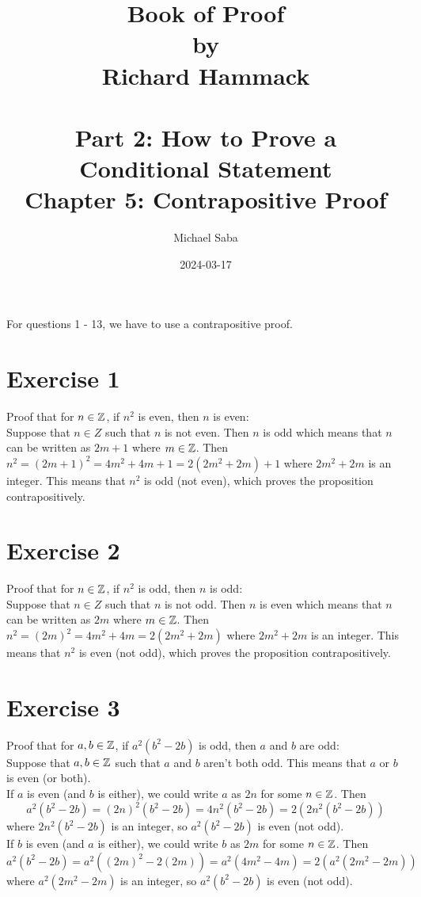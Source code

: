 \documentclass[12pt]{article}
\title{%
    \Huge Book of Proof \\
    \large by \\
    \Large Richard Hammack \\~\\
    \huge Part 2: How to Prove a Conditional Statement \\
    \LARGE Chapter 5: Contrapositive Proof
}
\date{2024-03-17}
\author{Michael Saba}
\begin{document}
    \maketitle
    \newpage
    \setlength{\parindent}{0pt}

    For questions 1 - 13, we have to use a contrapositive proof. \\

    \section*{Exercise 1}
    Proof that for $n \in \mathbb{Z}$,
    if $n^2$ is even,
    then $n$ is even: \\
    Suppose that $n \in Z$ 
    such that $n$ is not even.
    Then $n$ is odd which means
    that $n$ can be written as $2m + 1$ where $m \in \mathbb{Z}$.
    Then $n^2 = (2m+1)^2 = 4m^2 + 4m + 1 = 2(2m^2 + 2m) + 1$
    where $2m^2 + 2m$ is an integer.
    This means that $n^2$ is odd (not even),
    which proves the proposition contrapositively.

    \section*{Exercise 2}
    Proof that for $n \in \mathbb{Z}$,
    if $n^2$ is odd,
    then $n$ is odd: \\
    Suppose that $n \in Z$ 
    such that $n$ is not odd.
    Then $n$ is even which means
    that $n$ can be written as $2m$ where $m \in \mathbb{Z}$.
    Then $n^2 = (2m)^2 = 4m^2 + 4m = 2(2m^2 + 2m)$
    where $2m^2 + 2m$ is an integer.
    This means that $n^2$ is even (not odd),
    which proves the proposition contrapositively.

    \section*{Exercise 3}
    Proof that for $a, b \in \mathbb{Z}$,
    if $a^2(b^2 - 2b)$ is odd,
    then $a$ and $b$ are odd: \\
    Suppose that $a, b \in \mathbb{Z}$
    such that $a$ and $b$ aren't both odd. 
    This means that $a$ or $b$ is even (or both). \\
    If $a$ is even (and $b$ is either),
    we could write $a$ as $2n$ for some $n \in \mathbb{Z}$.
    Then
    \[ a^2(b^2 - 2b) = (2n)^2(b^2 - 2b)
    = 4n^2(b^2 - 2b) = 2(2n^2(b^2 - 2b)) \]
    where $2n^2(b^2 - 2b)$ is an integer,
    so $a^2(b^2 - 2b)$ is even (not odd). \\
    If $b$ is even (and $a$ is either),
    we could write $b$ as $2m$ for some $n \in \mathbb{Z}$.
    Then
    \[ a^2(b^2 - 2b) = a^2((2m)^2 - 2(2m))
    = a^2(4m^2 - 4m) = 2(a^2(2m^2 - 2m)) \]
    where $a^2(2m^2 - 2m)$ is an integer,
    so $a^2(b^2 - 2b)$ is even (not odd). \\
\end{document}
